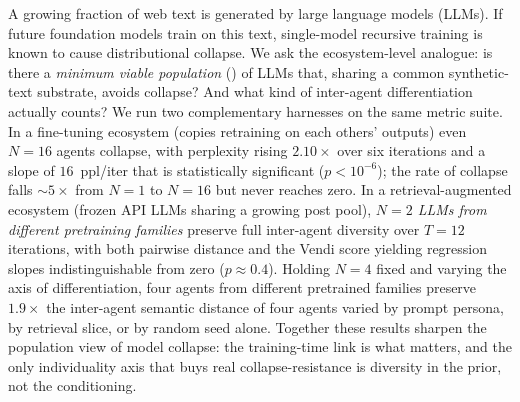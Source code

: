 A growing fraction of web text is generated by large language models (LLMs).
If future foundation models train on this text, single-model recursive
training is known to cause distributional collapse. We ask the
ecosystem-level analogue: is there a \emph{minimum viable population} (\mvp)
of LLMs that, sharing a common synthetic-text substrate, avoids collapse?
And what kind of inter-agent differentiation actually counts? We run two
complementary harnesses on the same metric suite. In a fine-tuning
ecosystem (\distilgpt copies retraining on each others' \wikitext outputs)
even $N{=}16$ agents collapse, with perplexity rising $2.10\times$ over
six iterations and a slope of $16$~ppl/iter that is statistically
significant ($p < 10^{-6}$); the rate of collapse falls $\sim 5\times$
from $N{=}1$ to $N{=}16$ but never reaches zero. In a retrieval-augmented
ecosystem (frozen API LLMs sharing a growing post pool), \emph{$N{=}2$
LLMs from different pretraining families} preserve full inter-agent
diversity over $T{=}12$ iterations, with both pairwise distance and the
Vendi score yielding regression slopes indistinguishable from zero
($p \approx 0.4$). Holding $N{=}4$ fixed and varying the axis of
differentiation, four agents from different pretrained families preserve
$\mathbf{1.9\times}$ the inter-agent semantic distance of four agents
varied by prompt persona, by retrieval slice, or by random seed alone.
Together these results sharpen the population view of model collapse: the
training-time link is what matters, and the only individuality axis that
buys real collapse-resistance is diversity in the prior, not the
conditioning.
